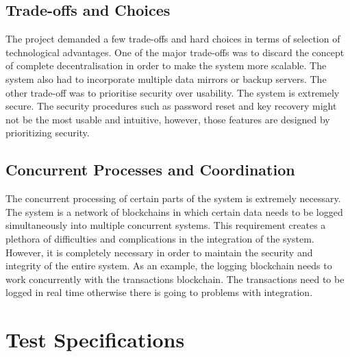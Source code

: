 \documentclass[a4paper,twoside,phd]{BYUPhys}
\begin{document}
\subsection{Trade-offs and Choices}
The project demanded a few trade-offs and hard choices in terms of selection of technological advantages. One of the major trade-offs was to discard the concept of complete decentralisation in order to make the system more scalable. The system also had to incorporate multiple data mirrors or backup servers. The other trade-off was to prioritise security over usability. The system is extremely secure. The security procedures such as password reset and key recovery might not be the most usable and intuitive, however, those features are designed by prioritizing security.
\subsection{Concurrent Processes and Coordination}
The concurrent processing of certain parts of the system is extremely necessary. The system is a network of blockchains in which certain data needs to be logged simultaneously into multiple concurrent systems. This requirement creates a plethora of difficulties and complications in the integration of the system\cite{PROBLEMSPROCESSING}. However, it is completely necessary in order to maintain the security and integrity of the entire system. As an example, the logging blockchain needs to work concurrently with the transactions blockchain. The transactions need to be logged in real time otherwise there is going to problems with integration.

\section{Test Specifications}
\end{document}

